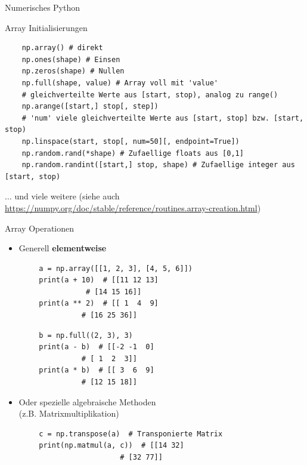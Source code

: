\documentclass[utf8, smaller, c]{beamer}
\begin{document}
\begin{frame}{Numerisches Python}
    \begin{block}{Array Initialisierungen}
    \begin{lstlisting}
    np.array() # direkt
    np.ones(shape) # Einsen
    np.zeros(shape) # Nullen
    np.full(shape, value) # Array voll mit 'value'
    # gleichverteilte Werte aus [start, stop), analog zu range()
    np.arange([start,] stop[, step])
    # 'num' viele gleichverteilte Werte aus [start, stop] bzw. [start, stop)
    np.linspace(start, stop[, num=50][, endpoint=True]) 
    np.random.rand(*shape) # Zufaellige floats aus [0,1]
    np.random.randint([start,] stop, shape) # Zufaellige integer aus [start, stop)
    \end{lstlisting}
    $\dots$ und viele weitere (siehe auch  {\footnotesize\url{https://numpy.org/doc/stable/reference/routines.array-creation.html}})    
    \end{block}
    
    \pagebreak
    
    \begin{block}{Array Operationen}
        \begin{itemize}
            \item Generell \textbf{elementweise}
        \end{itemize}
        \begin{minipage}{0.45\linewidth}
        \begin{lstlisting}
        a = np.array([[1, 2, 3], [4, 5, 6]])
        print(a + 10)  # [[11 12 13]
                   # [14 15 16]]
        print(a ** 2)  # [[ 1  4  9]
                  # [16 25 36]]
        \end{lstlisting}
        \end{minipage}
        \begin{minipage}{0.45\linewidth}
        \begin{lstlisting}
        b = np.full((2, 3), 3)
        print(a - b)  # [[-2 -1  0]
                  # [ 1  2  3]]
        print(a * b)  # [[ 3  6  9]
                  # [12 15 18]]
        \end{lstlisting}
        \end{minipage}
        \begin{itemize}
            \item Oder spezielle algebraische Methoden\\(z.B. Matrixmultiplikation)
        \end{itemize}
        \begin{lstlisting}
        c = np.transpose(a)  # Transponierte Matrix
        print(np.matmul(a, c))  # [[14 32]
                           # [32 77]]
        \end{lstlisting}
    \end{block}
    

\end{frame}
\end{document}
